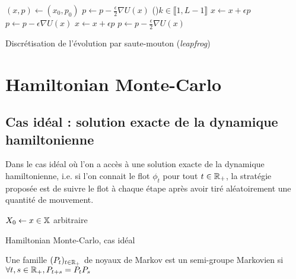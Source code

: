\documentclass[10pt,a4paper]{article}
\begin{document}
\begin{center}
	\begin{algorithm}[H]
		$(x,p) \leftarrow (x_0,p_0)$\;
		$p \leftarrow p - \frac{\epsilon}{2} \nabla U(x)$ 
		\For(){$k \in \llbracket 1,L-1 \rrbracket$}{
		$x \leftarrow x + \epsilon p$\;
		$p \leftarrow p - \epsilon \nabla U(x)$\;
		}
		$x \leftarrow x + \epsilon p$ 
		$p \leftarrow p - \frac{\epsilon}{2} \nabla U(x)$ 
		\caption{Discrétisation de l'évolution par saute-mouton (\emph{leapfrog})}
		\label{algo:leapfrog}
	\end{algorithm}
\end{center}

\section{Hamiltonian Monte-Carlo}

\subsection{Cas idéal : solution exacte de la dynamique hamiltonienne}

Dans le cas idéal où l'on a accès à une solution exacte de la dynamique hamiltonienne, i.e. si l'on connait le flot $\phi_t$ pour tout $t \in \mathbb{R}_+$, la stratégie proposée est de suivre le flot à chaque étape après avoir tiré aléatoirement une quantité de mouvement.

\begin{center}
	\begin{algorithm}[H]
		$X_0 \leftarrow x \in \mathbb{X}$ arbitraire\;
		\caption{Hamiltonian Monte-Carlo, cas idéal}
		\label{algo:HMC-ideal}
	\end{algorithm}
\end{center}

\begin{Def}
	Une famille $(P_t)_{t \in \mathbb{R}_+}$ de noyaux de Markov est un semi-groupe Markovien si $\forall t,s \in \mathbb{R}_+, P_{t+s} = P_t P_s$
\end{Def}
\end{document}
